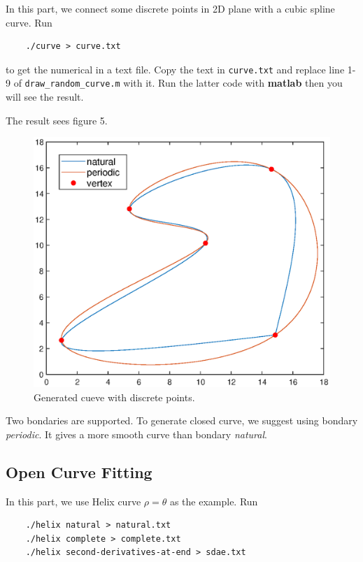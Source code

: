 \documentclass[11pt,en]{elegantpaper}
\begin{document}
In this part, we connect some discrete points in 2D plane with a cubic spline curve. Run

\begin{lstlisting}
    ./curve > curve.txt
\end{lstlisting}

to get the numerical in a text file. Copy the text in \verb|curve.txt| and replace line 1-9 of \verb|draw_random_curve.m| with it. Run the latter code with \textbf{matlab} then you will see the result.

The result sees figure 5.

\begin{figure}[htbp]
    \centering
    \begin{minipage}[t]{0.5\linewidth}
        \centering
        \includegraphics[width=0.7\linewidth]{figure/curve_random.eps}
        \caption{Generated cueve with discrete points.}
        \label{fig:side:a}
    \end{minipage}
\end{figure}

Two bondaries are supported. To generate closed curve, we suggest using bondary \textit{periodic}. It gives a more smooth curve than bondary \textit{natural}.

\subsection{Open Curve Fitting}

In this part, we use Helix curve $\rho=\theta$ as the example. Run

\begin{lstlisting}
    ./helix natural > natural.txt
    ./helix complete > complete.txt
    ./helix second-derivatives-at-end > sdae.txt
\end{lstlisting}
\end{document}
